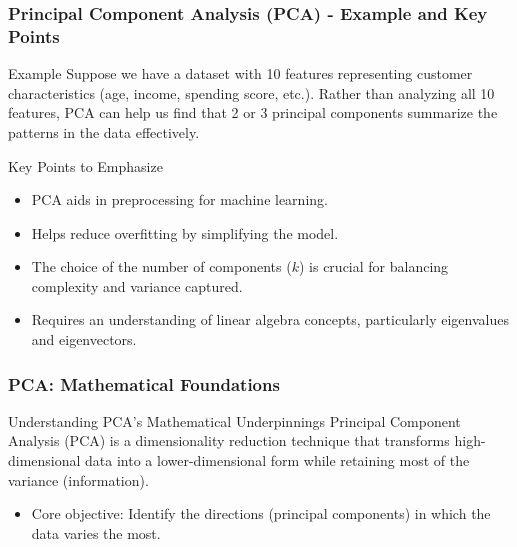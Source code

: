 \documentclass[aspectratio=169]{beamer}
\begin{document}
\begin{frame}[fragile]
    \frametitle{Principal Component Analysis (PCA) - Example and Key Points}
    \begin{block}{Example}
        Suppose we have a dataset with 10 features representing customer characteristics (age, income, spending score, etc.). Rather than analyzing all 10 features, PCA can help us find that 2 or 3 principal components summarize the patterns in the data effectively.
    \end{block}

    \begin{block}{Key Points to Emphasize}
        \begin{itemize}
            \item PCA aids in preprocessing for machine learning.
            \item Helps reduce overfitting by simplifying the model.
            \item The choice of the number of components (\(k\)) is crucial for balancing complexity and variance captured.
            \item Requires an understanding of linear algebra concepts, particularly eigenvalues and eigenvectors.
        \end{itemize}
    \end{block}
\end{frame}

\begin{frame}[fragile]
    \frametitle{PCA: Mathematical Foundations}
    \begin{block}{Understanding PCA's Mathematical Underpinnings}
        Principal Component Analysis (PCA) is a dimensionality reduction technique that transforms high-dimensional data into a lower-dimensional form while retaining most of the variance (information).
        \begin{itemize}
            \item Core objective: Identify the directions (principal components) in which the data varies the most.
        \end{itemize}
    \end{block}
\end{frame}
\end{document}
